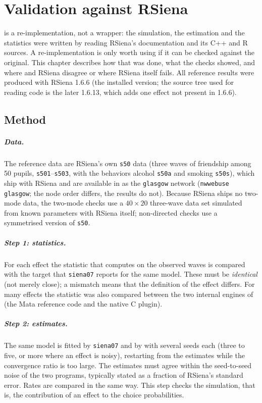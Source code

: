 \chapter{Validation against RSiena}\label{ch:validation}

\nwsaom{} is a re-implementation, not a wrapper: the simulation, the estimation and the statistics were written by reading RSiena's documentation and its C++ and R sources. A re-implementation is only worth using if it can be checked against the original. This chapter describes how that was done, what the checks showed, and where \nwsaom{} and RSiena disagree or where RSiena itself fails. All reference results were produced with RSiena 1.6.6 (the installed version; the source tree used for reading code is the later 1.6.13, which adds one effect not present in 1.6.6).

\section{Method}
\paragraph{Data.} The reference data are RSiena's own \texttt{s50} data (three waves of friendship among 50 pupils, \texttt{s501}--\texttt{s503}, with the behaviors alcohol \texttt{s50a} and smoking \texttt{s50s}), which ship with RSiena and are available in \nwsaom{} as the \texttt{glasgow} network (\texttt{nwwebuse glasgow}; the node order differs, the results do not). Because RSiena ships no two-mode data, the two-mode checks use a $40\times20$ three-wave data set simulated from known parameters with RSiena itself; non-directed checks use a symmetrised version of \texttt{s50}.

\paragraph{Step 1: statistics.} For each effect the statistic that \nwsaom{} computes on the observed waves is compared with the target that \texttt{siena07} reports for the same model. These must be \emph{identical} (not merely close); a mismatch means that the definition of the effect differs. For many effects the statistic was also compared between the two internal engines of \nwsaom{} (the Mata reference code and the native C plugin).

\paragraph{Step 2: estimates.} The same model is fitted by \texttt{siena07} and by \nwsaom{} with several seeds each (three to five, or more where an effect is noisy), restarting from the estimates while the convergence ratio is too large. The estimates must agree within the seed-to-seed noise of the two programs, typically stated as a fraction of RSiena's standard error. Rates are compared in the same way. This step checks the simulation, that is, the contribution of an effect to the choice probabilities.

